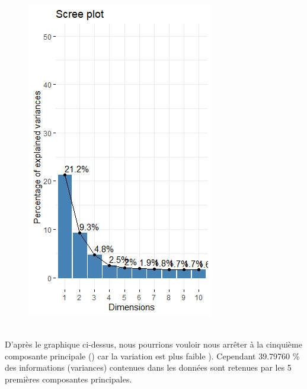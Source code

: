 \documentclass[12pt]{article}
\begin{document}
\newpage

 


\begin{figure}[H]
\begin{center}
\includegraphics[scale=1.4]{ACP_1.png} 
\caption[]{\ }
\end{center}
\end{figure}

D'après le graphique ci-dessus, nous pourrions vouloir nous 
arrêter à la cinquième composante principale () car la variation est plus faible ).
Cependant 39.79760 \% des informations (variances) contenues 
dans les données sont retenues par les 5  premières composantes principales.
\end{document}

